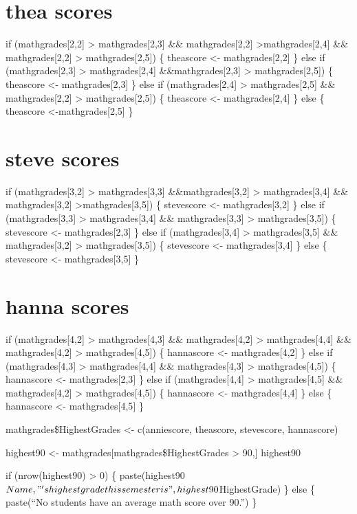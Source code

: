 \documentclass[
]{article}
\begin{document}
\hypertarget{thea-scores}{%
\section{thea scores}\label{thea-scores}}

if (mathgrades{[}2,2{]} \textgreater{} mathgrades{[}2,3{]} \&\&
mathgrades{[}2,2{]} \textgreater mathgrades{[}2,4{]} \&\&
mathgrades{[}2,2{]} \textgreater{} mathgrades{[}2,5{]}) \{ theascore
\textless- mathgrades{[}2,2{]} \} else if (mathgrades{[}2,3{]}
\textgreater{} mathgrades{[}2,4{]} \&\&mathgrades{[}2,3{]}
\textgreater{} mathgrades{[}2,5{]}) \{ theascore \textless-
mathgrades{[}2,3{]} \} else if (mathgrades{[}2,4{]} \textgreater{}
mathgrades{[}2,5{]} \&\& mathgrades{[}2,2{]} \textgreater{}
mathgrades{[}2,5{]}) \{ theascore \textless- mathgrades{[}2,4{]} \} else
\{ theascore \textless-mathgrades{[}2,5{]} \}

\hypertarget{steve-scores}{%
\section{steve scores}\label{steve-scores}}

if (mathgrades{[}3,2{]} \textgreater{} mathgrades{[}3,3{]}
\&\&mathgrades{[}3,2{]} \textgreater{} mathgrades{[}3,4{]} \&\&
mathgrades{[}3,2{]} \textgreater mathgrades{[}3,5{]}) \{ stevescore
\textless- mathgrades{[}3,2{]} \} else if (mathgrades{[}3,3{]}
\textgreater{} mathgrades{[}3,4{]} \&\& mathgrades{[}3,3{]}
\textgreater{} mathgrades{[}3,5{]}) \{ stevescore \textless-
mathgrades{[}2,3{]} \} else if (mathgrades{[}3,4{]} \textgreater{}
mathgrades{[}3,5{]} \&\& mathgrades{[}3,2{]} \textgreater{}
mathgrades{[}3,5{]}) \{ stevescore \textless- mathgrades{[}3,4{]} \}
else \{ stevescore \textless- mathgrades{[}3,5{]} \}

\hypertarget{hanna-scores}{%
\section{hanna scores}\label{hanna-scores}}

if (mathgrades{[}4,2{]} \textgreater{} mathgrades{[}4,3{]} \&\&
mathgrades{[}4,2{]} \textgreater{} mathgrades{[}4,4{]} \&\&
mathgrades{[}4,2{]} \textgreater{} mathgrades{[}4,5{]}) \{ hannascore
\textless- mathgrades{[}4,2{]} \} else if (mathgrades{[}4,3{]}
\textgreater{} mathgrades{[}4,4{]} \&\& mathgrades{[}4,3{]}
\textgreater{} mathgrades{[}4,5{]}) \{ hannascore \textless-
mathgrades{[}2,3{]} \} else if (mathgrades{[}4,4{]} \textgreater{}
mathgrades{[}4,5{]} \&\& mathgrades{[}4,2{]} \textgreater{}
mathgrades{[}4,5{]}) \{ hannascore \textless- mathgrades{[}4,4{]} \}
else \{ hannascore \textless- mathgrades{[}4,5{]} \}

mathgrades\$HighestGrades \textless- c(anniescore, theascore,
stevescore, hannascore)

highest90 \textless- mathgrades{[}mathgrades\$HighestGrades
\textgreater{} 90,{]} highest90

if (nrow(highest90) \textgreater{} 0) \{
paste(highest90\(Name, "'s highest grade this semester is", highest90\)HighestGrade)
\} else \{ paste(``No students have an average math score over 90.'') \}
\end{document}
